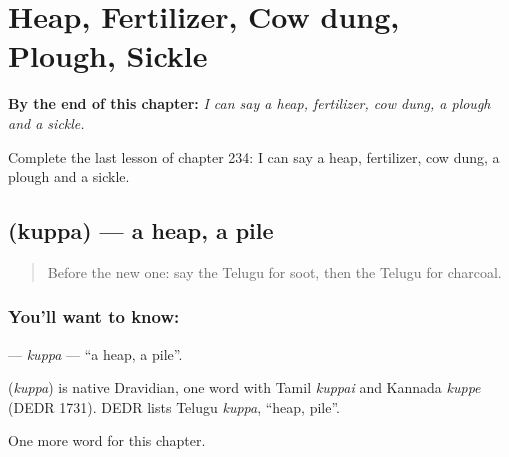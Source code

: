 
\chapter{Heap, Fertilizer, Cow dung, Plough, Sickle}
\label{ch:te-heap-fertilizer-cow-dung-plough-sickle}

\begin{chapteropening}
\textbf{By the end of this chapter:} \emph{I can say a heap, fertilizer, cow dung, a plough and a sickle.}

Complete the last lesson of chapter 234: I can say a heap, fertilizer, cow dung, a plough and a sickle.
\end{chapteropening}

\section[\texorpdfstring{\te{కుప్ప} (kuppa)}{కుప్ప (kuppa)}]{ (kuppa) — a heap, a pile}

\label{lesson:TE-C234-kuppa}



\begin{quote}
Before the new one: say the Telugu for soot, then the Telugu for charcoal.
\end{quote}

\subsection*{You'll want to know: }
\textbf{} — \emph{kuppa} — \textquotedblleft{}a heap, a pile\textquotedblright{}.

\begin{cousinweb}
\textbf{} (\emph{kuppa}) is native Dravidian, one word with Tamil \emph{kuppai} and Kannada \emph{kuppe} (DEDR 1731). DEDR lists Telugu \emph{kuppa}, \textquotedblleft{}heap, pile\textquotedblright{}.
\end{cousinweb}

\begin{grammarlens}[title={What you've built}]
One more word for this chapter.
\end{grammarlens}

